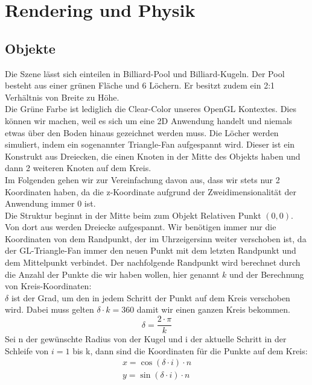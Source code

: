 \section{Rendering und Physik}

\subsection{Objekte}
	Die Szene lässt sich einteilen in Billiard-Pool und Billiard-Kugeln. Der Pool besteht aus einer grünen Fläche und 6 Löchern. Er besitzt zudem ein 2:1 Verhältnis von Breite zu Höhe. \\
	Die Grüne Farbe ist lediglich die Clear-Color unseres OpenGL Kontextes. Dies können wir machen, weil es sich um eine 2D Anwendung handelt und niemals etwas über den Boden hinaus gezeichnet werden muss. Die Löcher werden simuliert, indem ein sogenannter Triangle-Fan aufgespannt wird. Dieser ist ein Konstrukt aus Dreiecken, die einen Knoten in der Mitte des Objekts haben und dann  2 weiteren Knoten auf dem Kreis. \\
	Im Folgenden gehen wir zur Vereinfachung davon aus, dass wir stets nur 2 Koordinaten haben, da die z-Koordinate aufgrund der Zweidimensionalität der Anwendung immer 0 ist. \\
	Die Struktur beginnt in der Mitte beim zum Objekt Relativen Punkt $(0,0)$. Von dort aus werden Dreiecke aufgespannt. Wir benötigen immer nur die  Koordinaten von dem Randpunkt, der im Uhrzeigersinn weiter verschoben ist, da der GL-Triangle-Fan immer den neuen Punkt mit dem letzten Randpunkt und dem Mittelpunkt verbindet. Der nachfolgende Randpunkt wird berechnet durch die Anzahl der Punkte die wir haben wollen, hier genannt $k$ und der Berechnung von Kreis-Koordinaten: \\
	$\delta$ ist der Grad, um den in jedem Schritt der Punkt auf dem Kreis verschoben wird. Dabei muss gelten $\delta \cdot k = 360$ damit wir einen ganzen Kreis bekommen.\\
	\begin{equation}\label{eq:delta}
		\delta =\frac{2 \cdot \pi}{k} 
	\end{equation}
	Sei n der gewünschte Radius von der Kugel und i der aktuelle Schritt in der Schleife von $i=1$ bis k, dann sind die Koordinaten für die Punkte auf dem Kreis:
	\begin{equation}\label{eq:circleCoord}
		\begin{aligned}
			x = \cos (\delta \cdot i) \cdot n\\
			y = \sin (\delta \cdot i) \cdot n
		\end{aligned}
	\end{equation}
